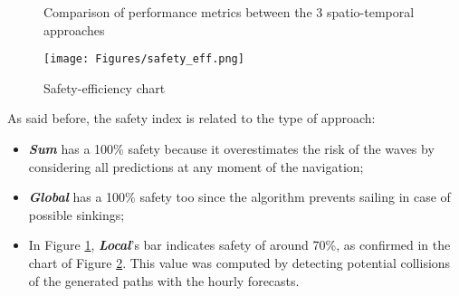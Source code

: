 \begin{figure}[H]
	\centering 
	\hspace{0.3cm}
	\vspace{0.0cm}
	\captionsetup{font=footnotesize,labelfont=footnotesize}
	\caption{Comparison of performance metrics between the 3 spatio-temporal approaches} 
	\label{compeffsaf1}
\end{figure}
\begin{figure}[H]
	\centering
	\texttt{[image: Figures/safety\_eff.png]}
	\caption{Safety-efficiency chart}
	\label{measureeffsaf}
\end{figure} 

As said before, the safety index is related to the type of approach: 
\begin{itemize}[itemsep=0pt]
	\item \textbf{\textit{Sum}} has a 100\% safety because it overestimates the risk of the waves by considering all predictions at any moment of the navigation;
	\item \textbf{\textit{Global}} has a 100\% safety too since the algorithm prevents sailing in case of possible sinkings;
	\item In Figure \ref{compeffsaf1}, \textbf{\textit{Local}}'s bar indicates safety of around 70\%, as confirmed in the chart of Figure \ref{measureeffsaf}. This value was computed by detecting potential collisions of the generated paths with the hourly forecasts. 
\end{itemize}
 
